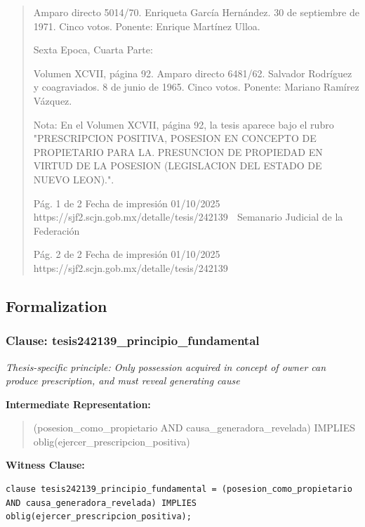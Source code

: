 \documentclass[11pt,a4paper]{article}
\begin{document}
\begin{quote}
Amparo directo 5014/70. Enriqueta García Hernández. 30 de septiembre de 1971. Cinco votos.
Ponente: Enrique Martínez Ulloa.

Sexta Epoca, Cuarta Parte:

Volumen XCVII, página 92. Amparo directo 6481/62. Salvador Rodríguez y coagraviados. 8 de junio
de 1965. Cinco votos. Ponente: Mariano Ramírez Vázquez.

Nota: En el Volumen XCVII, página 92, la tesis aparece bajo el rubro "PRESCRIPCION POSITIVA,
POSESION EN CONCEPTO DE PROPIETARIO PARA LA. PRESUNCION DE PROPIEDAD EN
VIRTUD DE LA POSESION (LEGISLACION DEL ESTADO DE NUEVO LEON).".




                                             Pág. 1 de 2             Fecha de impresión 01/10/2025
  https://sjf2.scjn.gob.mx/detalle/tesis/242139
                                                Semanario Judicial de la Federación




                                           Pág. 2 de 2       Fecha de impresión 01/10/2025
https://sjf2.scjn.gob.mx/detalle/tesis/242139

\end{quote}

\subsection{Formalization}

\subsubsection{Clause: tesis242139\_principio\_fundamental}

\textit{Thesis-specific principle: Only possession acquired in concept of owner can produce prescription, and must reveal generating cause}

\textbf{Intermediate Representation:}

\begin{quote}
(posesion\_como\_propietario AND causa\_generadora\_revelada) IMPLIES oblig(ejercer\_prescripcion\_positiva)
\end{quote}

\textbf{Witness Clause:}

\begin{lstlisting}[style=witnessstyle, language=Witness]
clause tesis242139_principio_fundamental = (posesion_como_propietario AND causa_generadora_revelada) IMPLIES oblig(ejercer_prescripcion_positiva);
\end{lstlisting}
\end{document}
